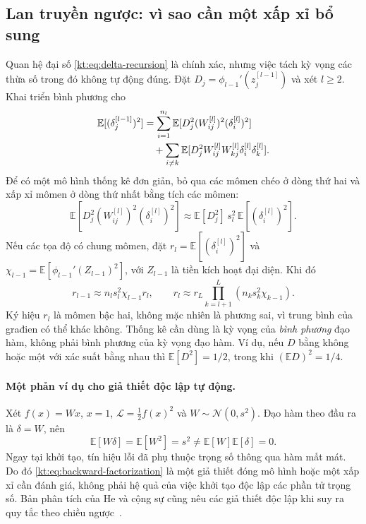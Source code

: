 \subsection{Lan truyền ngược: vì sao cần một xấp xỉ bổ sung}

Quan hệ đại số \eqref{kt:eq:delta-recursion} là chính xác, nhưng
việc tách kỳ vọng các thừa số trong đó không tự động đúng. Đặt
$D_j=\phi_{l-1}'(z_j^{[l-1]})$ và xét $l\geq2$. Khai triển
bình phương cho
\begin{align}
 \mathbb E[(\delta_j^{[l-1]})^2]
 &=\sum_{i=1}^{n_l}
  \mathbb E[D_j^2(W_{ij}^{[l]})^2(\delta_i^{[l]})^2]\notag\\
 &\quad+\sum_{i\ne k}
  \mathbb E[D_j^2 W_{ij}^{[l]}W_{kj}^{[l]}
                         \delta_i^{[l]}\delta_k^{[l]}].
 \label{kt:eq:backward-exact-moments}
\end{align}
Để có một mô hình thống kê đơn giản, bỏ qua các mômen chéo ở dòng
thứ hai và xấp xỉ mômen ở dòng thứ nhất bằng tích các mômen:
\begin{equation}
 \mathbb E[D_j^2(W_{ij}^{[l]})^2(\delta_i^{[l]})^2]
 \approx\mathbb E[D_j^2]\,s_l^2\,
                         \mathbb E[(\delta_i^{[l]})^2].
 \label{kt:eq:backward-factorization}
\end{equation}
Nếu các tọa độ có chung mômen, đặt
$r_l=\mathbb E[(\delta_i^{[l]})^2]$ và
$\chi_{l-1}=\mathbb E[\phi_{l-1}'(Z_{l-1})^2]$, với
$Z_{l-1}$ là tiền kích hoạt đại diện. Khi đó
\begin{equation}
 r_{l-1}\approx n_ls_l^2\chi_{l-1}r_l,
 \qquad
 r_l\approx r_L\prod_{k=l+1}^{L}
                    \left(n_ks_k^2\chi_{k-1}\right).
 \label{kt:eq:backward-moment}
\end{equation}
Ký hiệu $r_l$ là mômen bậc hai, không mặc nhiên là phương sai,
vì trung bình của građien có thể khác không. Thống kê cần dùng là
kỳ vọng của \emph{bình phương} đạo hàm, không phải bình phương
của kỳ vọng đạo hàm. Ví dụ, nếu $D$ bằng không hoặc một với xác
suất bằng nhau thì $\mathbb E[D^2]=1/2$, trong khi
$(\mathbb ED)^2=1/4$.

\paragraph{Một phản ví dụ cho giả thiết độc lập tự động.}
Xét $f(x)=Wx$, $x=1$, $\mathcal L=\tfrac12f(x)^2$ và
$W\sim\mathcal N(0,s^2)$. Đạo hàm theo đầu ra là $\delta=W$,
nên
\begin{equation}
 \mathbb E[W\delta]=\mathbb E[W^2]=s^2\ne
                    \mathbb E[W]\mathbb E[\delta]=0.
 \label{kt:eq:dependency-counterexample}
\end{equation}
Ngay tại khởi tạo, tín hiệu lỗi đã phụ thuộc trọng số thông qua
hàm mất mát. Do đó \eqref{kt:eq:backward-factorization} là một
giả thiết đóng mô hình hoặc một xấp xỉ cần đánh giá, không phải
hệ quả của việc khởi tạo độc lập các phần tử trọng số. Bản phân
tích của He và cộng sự cũng nêu các giả thiết độc lập khi suy ra
quy tắc theo chiều ngược~\cite{he2015}.

